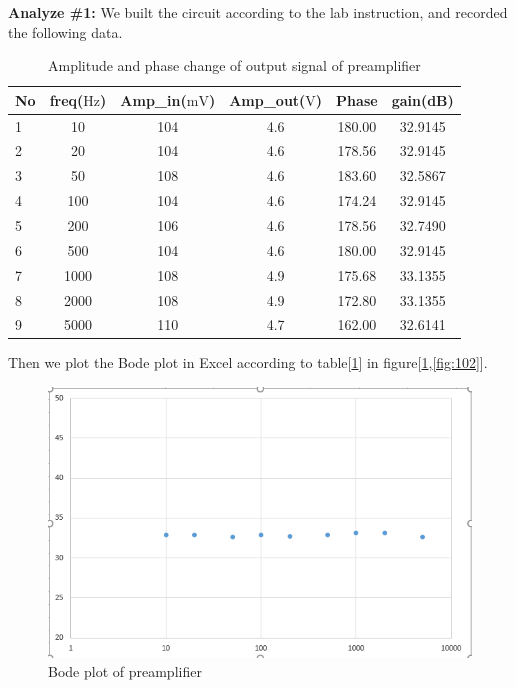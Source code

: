 \textbf{Analyze \#1:} \newline
\phantom{ } We built the circuit according to the lab instruction, and recorded the following data.
\begin{table}[!htbp]
	\centering
	\caption{Amplitude and phase change of output signal of preamplifier}
	\begin{tabular}{lccccc}
		\toprule
		No &freq($\si{\hertz}$) &Amp\_in($\si{\milli\volt}$)&Amp\_out($\si{\volt}$)&Phase&gain(dB)\\
		\midrule
		1	&10		&104	&4.6	&180.00	&32.9145\\
		2	&20		&104	&4.6	&178.56	&32.9145\\
		3	&50		&108	&4.6	&183.60	&32.5867\\
		4	&100	&104	&4.6	&174.24	&32.9145\\
		5	&200	&106	&4.6	&178.56	&32.7490\\
		6	&500	&104	&4.6	&180.00	&32.9145\\
		7	&1000	&108	&4.9	&175.68	&33.1355\\
		8	&2000	&108	&4.9	&172.80	&33.1355\\
		9	&5000	&110	&4.7	&162.00	&32.6141\\
		\bottomrule
	\end{tabular}
	\label{tab:preamp}
\end{table}
\phantom{ } Then we plot the Bode plot in Excel according to table[\ref{tab:preamp}] in figure[\ref{fig:101},\ref{fig:102}].

\begin{figure}[!htbp]
	\centering 
	\begin{framed}
		\includegraphics[width=\linewidth]{images/1_1.PNG} 
		\caption{Bode plot of preamplifier}
		\label{fig:101} 
	\end{framed}
\end{figure} 

